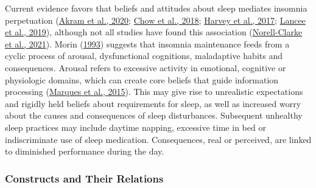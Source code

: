 \documentclass[
  ,doc,11pt, twoside,floatsintext]{apa6}
\begin{document}
Current evidence favors that beliefs and attitudes about sleep mediates insomnia perpetuation (\protect\hyperlink{ref-akram2020}{Akram et al., 2020}; \protect\hyperlink{ref-chow2018}{Chow et al., 2018}; \protect\hyperlink{ref-harvey2017}{Harvey et al., 2017}; \protect\hyperlink{ref-lancee2019}{Lancee et al., 2019}), although not all studies have found this association (\protect\hyperlink{ref-norell-clarke2021}{Norell-Clarke et al., 2021}). Morin (\protect\hyperlink{ref-morin1993}{1993}) suggests that insomnia maintenance feeds from a cyclic process of arousal, dysfunctional cognitions, maladaptive habits and consequences. Arousal refers to excessive activity in emotional, cognitive or physiologic domains, which can create core beliefs that guide information processing (\protect\hyperlink{ref-marques2015}{Marques et al., 2015}). This may give rise to unrealistic expectations and rigidly held beliefs about requirements for sleep, as well as increased worry about the causes and consequences of sleep disturbances. Subsequent unhealthy sleep practices may include daytime napping, excessive time in bed or indiscriminate use of sleep medication. Consequences, real or perceived, are linked to diminished performance during the day.

\hypertarget{constructs-and-their-relations}{%
\subsubsection{Constructs and Their Relations}\label{constructs-and-their-relations}}
\end{document}

